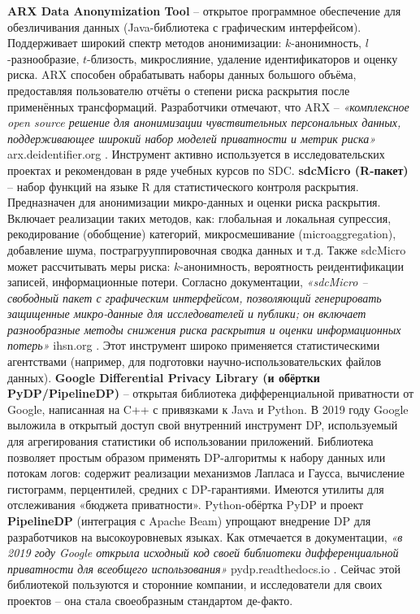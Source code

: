 \textbf{ARX Data Anonymization Tool} – открытое программное обеспечение для обезличивания данных (Java-библиотека с графическим интерфейсом). Поддерживает широкий спектр методов анонимизации: $k$-анонимность, $l$-разнообразие, $t$-близость, микрослияние, удаление идентификаторов и оценку риска. ARX способен обрабатывать наборы данных большого объёма, предоставляя пользователю отчёты о степени риска раскрытия после применённых трансформаций. Разработчики отмечают, что ARX – \textit{«комплексное open source решение для анонимизации чувствительных персональных данных, поддерживающее широкий набор моделей приватности и метрик риска»}
arx.deidentifier.org
. Инструмент активно используется в исследовательских проектах и рекомендован в ряде учебных курсов по SDC.
\textbf{sdcMicro (R-пакет)} – набор функций на языке R для статистического контроля раскрытия. Предназначен для анонимизации микро-данных и оценки риска раскрытия. Включает реализации таких методов, как: глобальная и локальная супрессия, рекодирование (обобщение) категорий, микросмешивание (microaggregation), добавление шума, пострагрууппировочная сводка данных и т.д. Также sdcMicro может рассчитывать меры риска: $k$-анонимность, вероятность реидентификации записей, информационные потери. Согласно документации, \textit{«sdcMicro – свободный пакет с графическим интерфейсом, позволяющий генерировать защищенные микро-данные для исследователей и публики; он включает разнообразные методы снижения риска раскрытия и оценки информационных потерь»}
ihsn.org
. Этот инструмент широко применяется статистическими агентствами (например, для подготовки научно-использовательских файлов данных).
\textbf{Google Differential Privacy Library (и обёртки PyDP/PipelineDP)} – открытая библиотека дифференциальной приватности от Google, написанная на C++ с привязками к Java и Python. В 2019 году Google выложила в открытый доступ свой внутренний инструмент DP, используемый для агрегирования статистики об использовании приложений. Библиотека позволяет простым образом применять DP-алгоритмы к набору данных или потокам логов: содержит реализации механизмов Лапласа и Гаусса, вычисление гистограмм, перцентилей, средних с DP-гарантиями. Имеются утилиты для отслеживания «бюджета приватности». Python-обёртка PyDP и проект \textbf{PipelineDP} (интеграция с Apache Beam) упрощают внедрение DP для разработчиков на высокоуровневых языках. Как отмечается в документации, \textit{«в 2019 году Google открыла исходный код своей библиотеки дифференциальной приватности для всеобщего использования»}
pydp.readthedocs.io
. Сейчас этой библиотекой пользуются и сторонние компании, и исследователи для своих проектов – она стала своеобразным стандартом де-факто.
